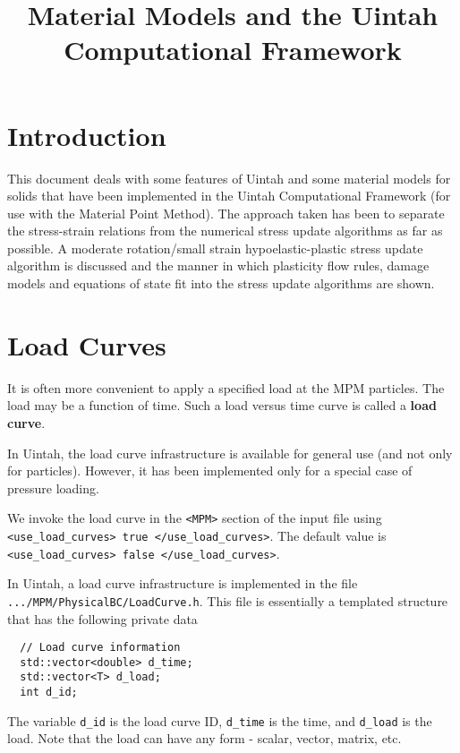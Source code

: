 
\title{Material Models and the Uintah Computational Framework}


\maketitle
\tableofcontents

\section{Introduction}
This document deals with some features of Uintah and some material models 
for solids that have been implemented in the Uintah Computational Framework 
(for use with the Material Point Method).  The approach taken has been to 
separate the stress-strain relations from the numerical stress update 
algorithms as far as possible.  A moderate rotation/small strain 
hypoelastic-plastic stress update algorithm is discussed and the manner in 
which plasticity flow rules, damage models and equations of state
fit into the stress update algorithms are shown.

\section{Load Curves}
It is often more convenient to apply a specified load at the MPM particles.
The load may be a function of time.  Such a load versus time curve is called
a {\bf load curve}.

In Uintah, the load curve infrastructure is available for general use
(and not only for particles).  However, it has been implemented only for
a special case of pressure loading.

We invoke the load curve in the \verb|<MPM>| section of the input file
using  \verb|<use_load_curves> true </use_load_curves>|.  The default value 
is \verb|<use_load_curves> false </use_load_curves>|.

In Uintah, a load curve infrastructure is implemented in the file
\verb|.../MPM/PhysicalBC/LoadCurve.h|.  This file is essentially a templated
structure that has the following private data
\begin{verbatim}
  // Load curve information 
  std::vector<double> d_time;
  std::vector<T> d_load;
  int d_id;
\end{verbatim}
The variable \verb|d_id| is the load curve ID, \verb|d_time| is the time,
and \verb|d_load| is the load.  Note that the load can have any form - scalar,
vector, matrix, etc.

